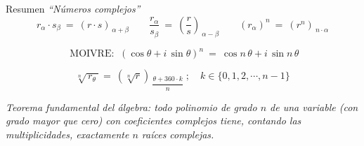 \begin{myblock}{Resumen \emph{``Números complejos''}}
$$r_\alpha \cdot s_\beta \ = \ (r\cdot s)_{\, \alpha+\beta} \qquad \dfrac{r_\alpha}{s_\beta}\ = \ \left( \dfrac r s \right)_{\ \alpha-\beta} \qquad (r_\alpha)^n \ = \ (r^n)_{\ n\cdot \alpha}$$

$$ \text{ MOIVRE: } \ (\cos \theta+i\, \sin \theta)^n \ = \ \cos n\, \theta+i\, \sin n\, \theta $$

$$\sqrt[n]{\, r_\theta \ } = \ (\sqrt[n]{r})_{\ \dfrac{\theta+360\cdot k}{n}}\ ; \quad k\in\{0,1,2,\cdots ,n-1\}$$

\vspace{2mm} \emph{Teorema fundamental del álgebra: todo polinomio de grado $n$ de una variable (con grado mayor que cero) con coeficientes complejos tiene, contando las multiplicidades, exactamente $n$ raíces complejas.}	
	
\end{myblock}





